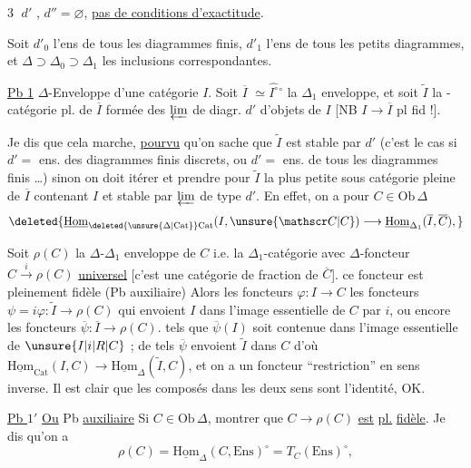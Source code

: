 \textcircled{3}  $d'$  , $d''=\varnothing$, \uline{pas de conditions d'exactitude}.

 Soit $d'_0$ l'ens de tous les diagrammes finis, $d'_1$ l'ens de tous les petits diagrammes, et $\Delta\supset\Delta_0\supset\Delta_1$ les inclusions correspondantes.

\uline{Pb 1} $\Delta$-Enveloppe  d'une catégorie $I$. Soit $\overline I$  $\simeq\widehat{I^\circ}{}^\circ$ la $\Delta_1$ enveloppe, et soit $\widetilde I$ la -catégorie pl. de $\overline I$ formée des $\varprojlim$ de diagr. $d'$ d'objets de $I$ [NB $I\longrightarrow\overline I$ pl fid !].

Je dis que cela marche, \uline{pourvu} qu'on sache que $\widetilde I$ est stable par $d'$ (c'est le cas si $d'=$ ens. des diagrammes finis discrets, ou $d'=$ ens. de tous les diagrammes finis \inserted{(!)} \ldots) sinon on doit itérer et prendre  pour $\widetilde I$ la plus petite sous catégorie  pleine de $\overline I$ contenant $I$ et stable par $\varprojlim$ de type $d'$. En effet, on a pour $C\in\mathrm{Ob}\,\Delta$
\[
\deleted{\underline{\mathrm{Hom}}_{\deleted{\unsure{\Delta|\mathrm{Cat}}}\mathrm{Cat}}(I,\unsure{\mathscr C|C})\longrightarrow\underline{\mathrm{Hom}}_{\Delta_1}(\overline I,\overline C),}
\]

Soit $\rho(C)$ la $\Delta$-$\Delta_1$ enveloppe de $C$ i.e. la $\Delta_1$-catégorie avec $\Delta$-foncteur $C\xrightarrow{i}\rho(C)$ \uline{universel} [c'est une catégorie  de fraction de $\overline C$].    ce foncteur est pleinement fidèle (Pb auxiliaire)  Alors les foncteurs $\varphi:I\longrightarrow C$   les foncteurs $\psi=i\varphi:\widetilde I\longrightarrow\rho(C)$ qui envoient $I$ dans l'image essentielle de $C$ par $i$, ou encore les foncteurs $\overline\psi:\overline I\longrightarrow\rho(C)$. tels que $\overline\psi(I)$ soit contenue dans l'image essentielle de $\unsure{I|i|R|C}$ ; de tels $\overline\psi$ envoient $\widetilde I$ dans $C$ d'où $\underline{\mathrm{Hom}}_{\mathrm{Cat}}(I,C)\longrightarrow\underline{\mathrm{Hom}}_{\Delta}(\widetilde I,C)$, et on a un foncteur ``restriction'' en sens inverse. Il est clair que les composés dans les deux sens sont l'identité, OK.

\uline{Pb $1'$} \uline{Ou} Pb \uline{auxiliaire} Si $C\in\mathrm{Ob}\,\Delta$, montrer que $C\longrightarrow\rho(C)$ \uline{est} \uline{pl.} \uline{fidèle}. Je dis qu'on a
\[
\rho(C)=\underline{\mathrm{Hom}}_\Delta(C,\mathrm{Ens})^\circ=T_C(\mathrm{Ens})^\circ,
\]
